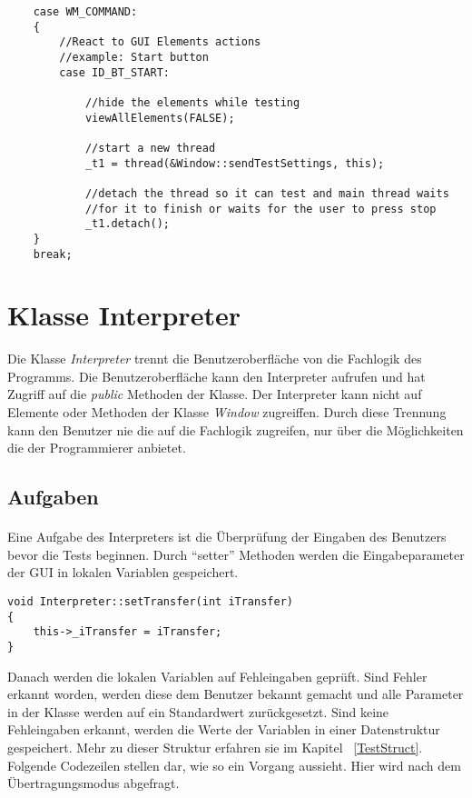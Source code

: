 \begin{lstlisting}	 
	case WM_COMMAND:
	{
		//React to GUI Elements actions
		//example: Start button
		case ID_BT_START:

			//hide the elements while testing
			viewAllElements(FALSE);

			//start a new thread
			_t1 = thread(&Window::sendTestSettings, this);

			//detach the thread so it can test and main thread waits
			//for it to finish or waits for the user to press stop
			_t1.detach();
	}
    break;
\end{lstlisting}




\newpage

\section{Klasse Interpreter}

Die Klasse \textit{Interpreter} trennt die Benutzeroberfläche von die Fachlogik des Programms. Die Benutzeroberfläche kann den Interpreter aufrufen und hat Zugriff auf die \textit{public} Methoden der Klasse. Der Interpreter kann nicht auf Elemente oder Methoden der Klasse \textit{Window} zugreiffen. Durch diese Trennung kann den Benutzer nie die auf die Fachlogik zugreifen, nur über die Möglichkeiten die der Programmierer anbietet.\\

\subsection{Aufgaben}
\paragraph{}
Eine Aufgabe des Interpreters ist die Überprüfung der Eingaben des Benutzers bevor die Tests beginnen. Durch "`setter"' Methoden werden die Eingabeparameter der GUI in lokalen Variablen gespeichert.\\


\begin{lstlisting}	 
void Interpreter::setTransfer(int iTransfer)
{
	this->_iTransfer = iTransfer;
}
\end{lstlisting}

Danach werden die lokalen Variablen auf Fehleingaben geprüft. Sind Fehler erkannt worden, werden diese dem Benutzer bekannt gemacht und alle Parameter in der Klasse werden auf ein Standardwert zurückgesetzt. Sind keine Fehleingaben erkannt, werden die Werte der Variablen in einer Datenstruktur gespeichert. Mehr zu dieser Struktur erfahren sie im Kapitel ~\ref{TestStruct}. Folgende Codezeilen stellen dar, wie so ein Vorgang aussieht. Hier wird nach dem Übertragungsmodus abgefragt.

